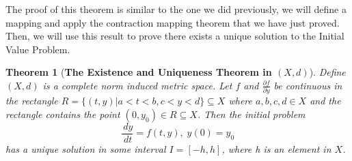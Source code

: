 \documentclass{article}
\newtheorem{theorem}{Theorem}[section]
\theoremstyle{definition}
\theoremstyle{remark}
\theoremstyle{example}
\begin{document}
The proof of this theorem is similar to the one we did previously, we will define a mapping and apply the contraction mapping theorem that we have just proved. Then, we will use this result to prove there exists a unique solution to the Initial Value Problem.

\begin{theorem}[\textbf{The Existence and Uniqueness Theorem in $(X,d)$}]\cite{r_kent_nagle_fundamentals_2011}\label{thm:EUTXd}
    Define $(X,d)$ is a complete norm induced metric space. Let $f$ and $\tfrac{\partial f}{\partial y}$ be continuous in the rectangle $R = \{(t,y)|a < t < b, c < y < d\} \subseteq X$ where $a,b,c,d \in X$ and the rectangle contains the point $(0, y_0) \in R \subseteq X$. Then the initial problem
    \begin{equation}
        \dfrac{\,dy}{\,dt} = f(t,y),\; y(0) = y_0
    \end{equation}
has a unique solution in some interval $I = [-h, h]$, where h is an element in $X$.
\end{theorem}
\end{document}
